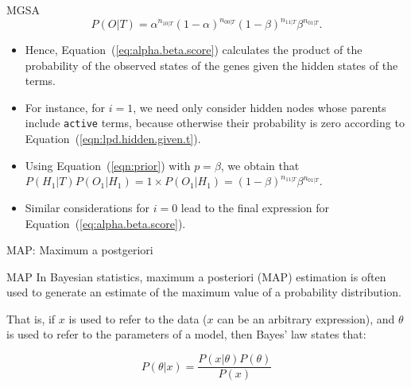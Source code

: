 \documentclass{beamer}
\newcommand{\numberofgenes}[3][|T]{n_{#2#3#1}}
\begin{document}
 \begin{frame}{MGSA}
  \begin{equation}
P(O|T) = \alpha^{\numberofgenes{1}{0}} (1 - \alpha)^{\numberofgenes{0}{0}}
(1-\beta)^{\numberofgenes{1}{1}} \beta^{\numberofgenes{0}{1}}.
\label{eq:alpha.beta.score}
\end{equation}
\begin{itemize}
 \item Hence, Equation~(\ref{eq:alpha.beta.score}) calculates the product
of the probability of the observed states of the genes
given the hidden states of the terms. 
\item For instance, for $i=1$, we need
only consider hidden nodes whose parents include \texttt{active}
terms, because otherwise their probability is zero according to
Equation~(\ref{eqn:lpd.hidden.given.t}).
\item Using Equation~(\ref{eqn:prior})
with $p=\beta$, we obtain that $P(H_1|T) P(O_1|H_1)=1\times P(O_1|H_1) =
(1-\beta)^{\numberofgenes{1}{1}}
\beta^{\numberofgenes{0}{1}}$. 
\item Similar considerations for $i=0$ lead
to the final expression for Equation~(\ref{eq:alpha.beta.score}).
\end{itemize}

 \end{frame}


\begin{frame}{MAP: Maximum a postgeriori}
 \begin{mybluebox}{MAP}
   In Bayesian statistics, maximum a posteriori (MAP) estimation is often
used to generate an estimate of the maximum value of a probability
distribution. 
 \end{mybluebox}

That is, if $x$ is used to refer to the data ($x$ can be
an arbitrary expression), and $\theta$ is used to refer to the
parameters of a model, then Bayes' law states that:

\begin{equation}
P(\theta | x) = \dfrac{P(x|\theta )P(\theta )}{P(x)}
\label{eq:bayes-law-for-map}
\end{equation}
 
\end{frame}
\end{document}
